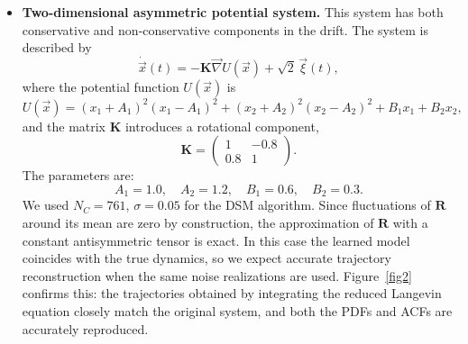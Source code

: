\documentclass[%
  prl,
  reprint,
  amsmath,
  amssymb,
  aps
]{revtex4-2}
\newcommand{\vvec}[1]{\vec{#1}}
\begin{document}
\begin{itemize}
    \item \textbf{Two-dimensional asymmetric potential system.} This system has both conservative and non-conservative components in the drift. The system is described by
    \begin{equation}
    \dot{\vvec{x}}(t) = -\bm{K}\vvec{\nabla} U(\vvec{x}) + \sqrt{2}\,\vvec{\xi}(t),
    \end{equation}
    where the potential function $U(\vvec{x})$ is
    \begin{equation}
    U(\vvec{x}) = (x_1 + A_1)^2 (x_1 - A_1)^2 + (x_2 + A_2)^2 (x_2 - A_2)^2 + B_1 x_1 + B_2 x_2,
    \end{equation}
    and the matrix $\bm{K}$ introduces a rotational component,
    \begin{equation}
    \bm{K} = \begin{pmatrix}
    1 & -0.8 \\
    0.8 & 1
    \end{pmatrix}.
    \end{equation}
    The parameters are:
    \begin{equation}
    A_1 = 1.0, \quad A_2 = 1.2, \quad B_1 = 0.6, \quad B_2 = 0.3.
    \end{equation}
    We used $N_C=761$, $\sigma=0.05$ for the DSM algorithm.
    Since fluctuations of $\bm{R}$ around its mean are zero by construction, the approximation of $\bm{R}$ with a constant antisymmetric tensor is exact. In this case the learned model coincides with the true dynamics, so we expect accurate trajectory reconstruction when the same noise realizations are used. Figure~\ref{fig2} confirms this: the trajectories obtained by integrating the reduced Langevin equation closely match the original system, and both the PDFs and ACFs are accurately reproduced.


\end{itemize}
\end{document}
